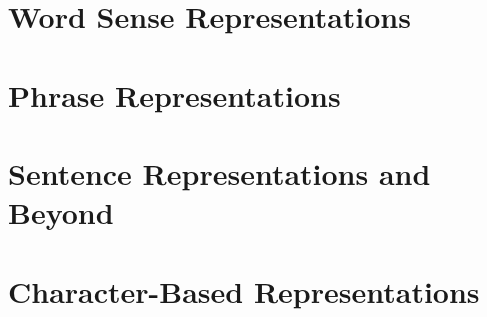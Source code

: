 \documentclass[12pt,parskip]{komatufte}
\begin{document}




\chapter{Word Sense Representations}\label{sec:word-sense-representations}
\chapter{Phrase Representations}\label{sec:phrase-representations}
\chapter{Sentence Representations and Beyond}\label{sec:sentence-representations-and-beyond}
\chapter{Character-Based Representations}\label{sec:character-based-representations}
\end{document}

